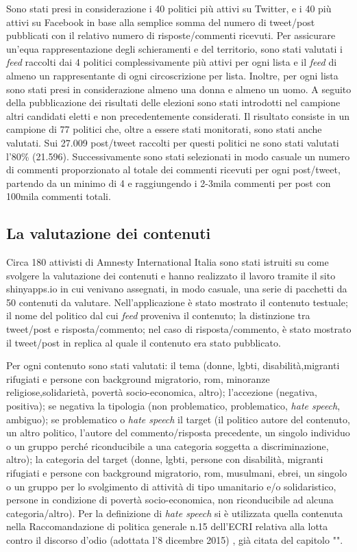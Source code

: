 Sono stati presi in considerazione i 40 politici più attivi su Twitter, e i 40 più attivi su Facebook in base alla semplice somma del numero di tweet/post pubblicati con il relativo numero di risposte/commenti ricevuti.
Per assicurare un’equa rappresentazione degli schieramenti e del territorio, sono stati valutati i \textit{feed} raccolti dai 4 politici complessivamente più attivi per ogni lista e il \textit{feed} di almeno un rappresentante di ogni circoscrizione per lista. Inoltre, per ogni lista sono stati presi in considerazione almeno una donna e almeno un uomo. A seguito della pubblicazione dei risultati delle elezioni sono stati introdotti nel campione altri candidati eletti e non precedentemente considerati. Il risultato consiste in un campione di 77 politici che, oltre a essere stati monitorati, sono stati anche valutati. Sui 27.009 post/tweet raccolti per questi politici ne sono stati valutati l'80\% (21.596). Successivamente sono stati selezionati in modo casuale un numero di commenti proporzionato al totale dei commenti ricevuti per ogni post/tweet, partendo da un minimo di 4 e raggiungendo i 2-3mila commenti per post con 100mila commenti totali.

\subsection{La valutazione dei contenuti}
Circa 180 attivisti di Amnesty International Italia sono stati istruiti su come svolgere la valutazione dei contenuti e hanno realizzato il lavoro tramite il sito shinyapps.io in cui venivano assegnati, in modo casuale, una serie di pacchetti da 50 contenuti da valutare. Nell'applicazione è stato mostrato il contenuto testuale; il nome del politico dal cui \textit{feed} proveniva il contenuto; la distinzione tra tweet/post e risposta/commento; nel  caso di  risposta/commento, è stato mostrato il  tweet/post in replica al  quale il contenuto era stato pubblicato.

Per ogni contenuto sono stati valutati: il tema (donne, lgbti, disabilità,migranti rifugiati e persone con background migratorio, rom, minoranze religiose,solidarietà, povertà socio-economica, altro); l'accezione (negativa, positiva); se negativa la tipologia (non problematico, problematico, \textit{hate speech}, ambiguo); se problematico o \textit{hate speech} il target (il politico autore del contenuto, un altro politico, l'autore del commento/risposta precedente, un singolo individuo o un gruppo perché riconducibile a una categoria soggetta a discriminazione, altro); la categoria del  target (donne, lgbti,  persone  con  disabilità, migranti rifugiati e persone con  background migratorio, rom, musulmani, ebrei, un singolo o  un gruppo per lo svolgimento di attività di tipo umanitario e/o solidaristico, persone in condizione di  povertà socio-economica, non  riconducibile ad  alcuna categoria/altro).
Per la definizione di \textit{hate speech} si è utilizzata quella contenuta nella Raccomandazione di politica generale n.15  dell'ECRI relativa alla lotta contro il discorso d'odio (adottata l'8 dicembre 2015) \citep{ecri2015}, già citata del capitolo "".

